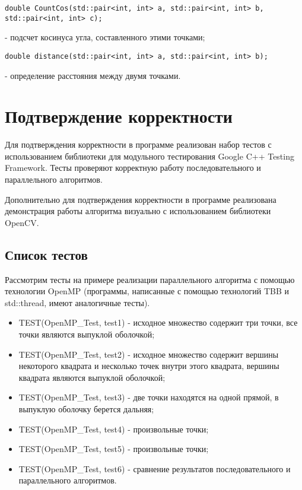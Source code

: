 \documentclass{article}
\begin{document}
\vspace{10pt}
\begin{lstlisting}
double CountCos(std::pair<int, int> a, std::pair<int, int> b, std::pair<int, int> c);
\end{lstlisting}
\vspace{-25pt}

- подсчет косинуса угла, составленного этими точками;

\vspace{10pt}
\begin{lstlisting}
double distance(std::pair<int, int> a, std::pair<int, int> b);
\end{lstlisting}
\vspace{-25pt}

- определение расстояния между двумя точками.

\newpage

\section{Подтверждение корректности}
Для подтверждения корректности в программе реализован набор тестов с использованием библиотеки для модульного тестирования Google C++ Testing Framework. Тесты проверяют корректную работу последовательного и параллельного алгоритмов.
\par Дополнительно для подтверждения корректности в программе реализована демонстрация работы алгоритма визуально с использованием библиотеки OpenCV.

\subsection{Список тестов}
Рассмотрим тесты на примере реализации параллельного алгоритма с помощью технологии OpenMP (программы, написанные с помощью технологий TBB и std::thread, имеют аналогичные тесты).
\begin{itemize}
\item TEST(OpenMP\_Test, test1) - исходное множество содержит три точки, все точки являются выпуклой оболочкой;
\item TEST(OpenMP\_Test, test2) - исходное множество содержит вершины некоторого квадрата и несколько точек внутри этого квадрата, вершины квадрата являются выпуклой оболочкой;
\item TEST(OpenMP\_Test, test3) - две точки находятся на одной прямой, в выпуклую оболочку берется дальняя;
\item TEST(OpenMP\_Test, test4) - произвольные точки;
\item TEST(OpenMP\_Test, test5) - произвольные точки;
\item TEST(OpenMP\_Test, test6) - сравнение результатов последовательного и параллельного алгоритмов.
\end{itemize}
\end{document}
